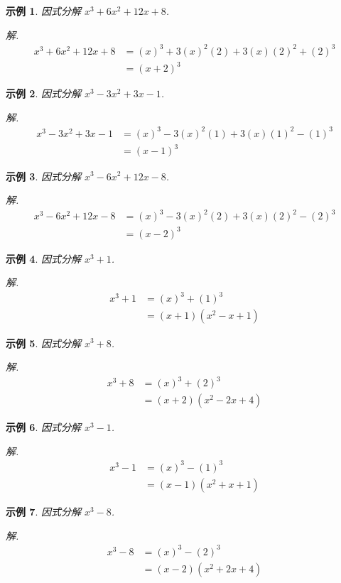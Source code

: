 \documentclass[12pt]{article}
\newtheorem{example}{示例}
\begin{document}
    \begin{example}
        因式分解 $x^3+6x^2+12x+8$.
    \end{example}
    \textit{ 解. }\begin{align*}
        x^3+6x^2+12x+8&=(x)^3+3(x)^2(2)+3(x)(2)^2+(2)^3\\
        &=(x+2)^3
    \end{align*}

    \begin{example}
        因式分解 $x^3-3x^2+3x-1$.
    \end{example}
    \textit{ 解. }\begin{align*}
        x^3-3x^2+3x-1&=(x)^3-3(x)^2(1)+3(x)(1)^2-(1)^3\\
        &=(x-1)^3
    \end{align*}

    \begin{example}
        因式分解 $x^3-6x^2+12x-8$.
    \end{example}
    \textit{ 解. }\begin{align*}
        x^3-6x^2+12x-8&=(x)^3-3(x)^2(2)+3(x)(2)^2-(2)^3\\
        &=(x-2)^3
    \end{align*}

    \begin{example}
        因式分解 $x^3+1$.
    \end{example}
    \textit{ 解. }\begin{align*}
        x^3+1&=(x)^3+(1)^3\\
        &=(x+1)(x^2-x+1)
    \end{align*}

    \begin{example}
        因式分解 $x^3+8$.
    \end{example}
    \textit{ 解. }\begin{align*}
        x^3+8&=(x)^3+(2)^3\\
        &=(x+2)(x^2-2x+4)
    \end{align*}

    \begin{example}
        因式分解 $x^3-1$.
    \end{example}
    \textit{ 解. }\begin{align*}
        x^3-1&=(x)^3-(1)^3\\
        &=(x-1)(x^2+x+1)
    \end{align*}

    \begin{example}
        因式分解 $x^3-8$.
    \end{example}
    \textit{ 解. }\begin{align*}
        x^3-8&=(x)^3-(2)^3\\
        &=(x-2)(x^2+2x+4)
    \end{align*}
\end{document}
